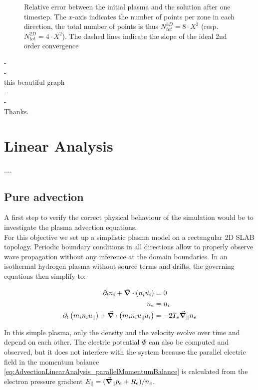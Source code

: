 \begin{figure}[H]
\begin{subfigure}[b]{0.49\textwidth}
		\label{fig:MMSTorturedVortAPara3DConvergence}
	\end{subfigure}
	\caption{Relative error between the initial plasma and the solution after one timestep. The $x$-axis indicates the number of points per zone in each direction, the total number of points is thus $N_{tot}^{3D} = 8\cdot X^3$ (resp. $N_{tot}^{2D} = 4\cdot X^2$). The dashed lines indicate the slope of the ideal 2nd order convergence}
	\label{fig:MMSTorturedVortAParaConvergence}
\end{figure}
- \\
- \\
this beautiful graph \\ - \\ - \\ Thanks.


\section{Linear Analysis}

.... 
\subsection{Pure advection}
A first step to verify the correct physical behaviour of the simulation would be to investigate the plasma advection equations. \\
For this objective we set up a simplistic plasma model on a rectangular 2D SLAB topology. Periodic boundary conditions in all directions allow to properly observe wave propagation without any inference at the domain boundaries. In an isothermal hydrogen plasma without source terms and drifts, the governing equations then simplify to:

\begin{align}
	\partial_t n_i + \vec{\grad}\cdot\left(n_i\vec{u}_i\right) &= 0 \label{eq:AdvectionLinearAnalysis_ionMass} \\
	n_e &= n_i \label{eq:AdvectionLinearAnalysis_quasiNeutrality} \\
	\partial_t \left(m_in_iu_\parallel\right) + \vec{\grad}\cdot\left(m_in_iu_\parallel u_i\right) &= -2T_e\vec{\grad}_\parallel n_e \label{eq:AdvectionLinearAnalysis_parallelMomentumBalance}
\end{align}

In this simple plasma, only the density and the velocity evolve over time and depend on each other. The electric potential $\Phi$ can also be computed and observed, but it does not interfere with the system because the parallel electric field in the momentum balance \autoref{eq:AdvectionLinearAnalysis_parallelMomentumBalance} is calculated from the electron pressure gradient $E_\parallel = (\vec{\grad}_\parallel p_e + R_e) / n_e$. \\

